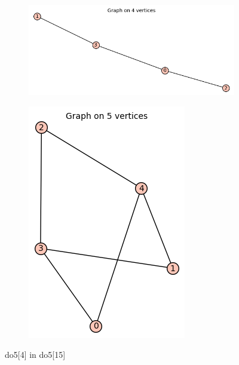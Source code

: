 \documentclass[12pt, a4paper]{article}
\begin{document}
\begin{center}
\begin{figure}
\centering
\begin{subfigure}{0.5\textwidth}
  \centering
  \includegraphics[width=0.6\linewidth]{do5[4]}
\end{subfigure}%
\begin{subfigure}{0.5\textwidth}
  \centering
  \includegraphics[width=0.5\linewidth]{do5[15]}
\end{subfigure}
\caption{do5[4] in do5[15]}
\label{fig:test}
\end{figure}


\end{center}
\end{document}

